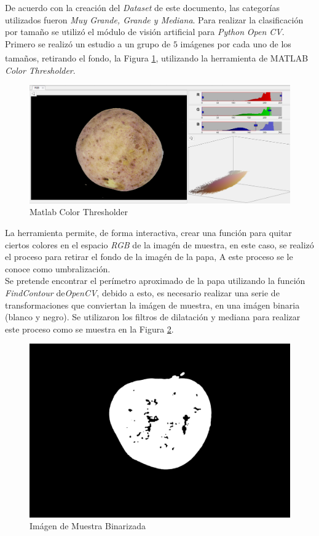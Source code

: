 De acuerdo con la creación del \textit{Dataset} de este documento, las categorías utilizados fueron \textit{Muy Grande, Grande y Mediana}. Para realizar la clasificación por tamaño se utilizó el módulo de visión artificial para \textit{Python} \textit{Open CV}. Primero se realizó un estudio a un grupo de $5$ imágenes por cada uno de los tamaños, retirando el fondo, la Figura \ref{fig:matlabcv}, utilizando la herramienta de MATLAB\textsuperscript{\textregistered} \textit{Color Thresholder}.


\begin{figure}[ht]
	\centering
	\includegraphics[scale=0.3]{Figs/matlabcv.png}
	\caption{Matlab Color Thresholder}
	\label{fig:matlabcv}
\end{figure}

La herramienta permite, de forma interactiva, crear una función para quitar ciertos colores en el espacio \textit{RGB} de la imagén de muestra, en este caso, se realizó el proceso para retirar el fondo de la imagén de la papa, A este proceso se le conoce como umbralización. \\

Se pretende encontrar el perímetro aproximado de la papa utilizando la función \textit{FindContour} de\textit{OpenCV}, debido a esto, es necesario realizar una serie de transformaciones que conviertan la imágen de muestra, en una imágen binaria (blanco y negro). Se utilizaron los filtros de dilatación y mediana para realizar este proceso como se muestra en la Figura \ref{fig:dilmed}.	

\begin{figure}[ht]
	\centering
	\includegraphics[scale=0.05]{Figs/dilmed.png}
	\caption{Imágen de Muestra Binarizada}
	\label{fig:dilmed}
\end{figure}

